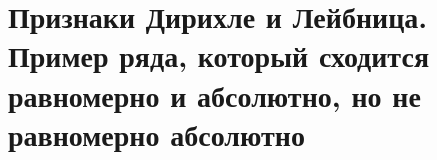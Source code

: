 \section{Признаки Дирихле и Лейбница. Пример ряда, который сходится равномерно и абсолютно, но не равномерно абсолютно}
